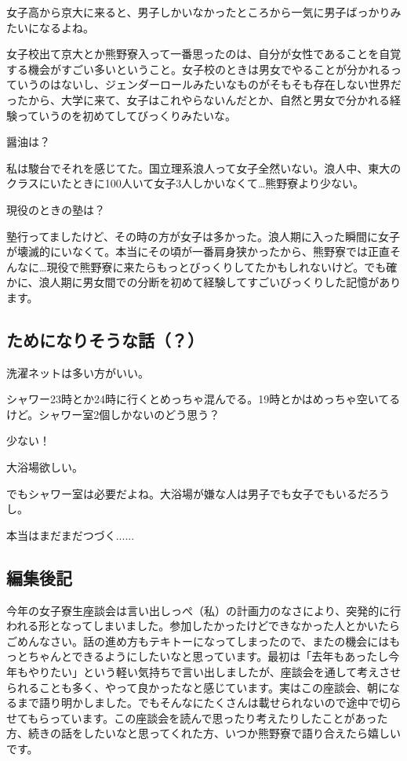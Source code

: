 \begin{multicols}{2}
  女子高から京大に来ると、男子しかいなかったところから一気に男子ばっかりみたいになるよね。

  女子校出て京大とか熊野寮入って一番思ったのは、自分が女性であることを自覚する機会がすごい多いということ。女子校のときは男女でやることが分かれるっていうのはないし、ジェンダーロールみたいなものがそもそも存在しない世界だったから、大学に来て、女子はこれやらないんだとか、自然と男女で分かれる経験っていうのを初めてしてびっくりみたいな。

  醤油は？

  私は駿台でそれを感じてた。国立理系浪人って女子全然いない。浪人中、東大のクラスにいたときに100人いて女子3人しかいなくて…熊野寮より少ない。

  現役のときの塾は？

  塾行ってましたけど、その時の方が女子は多かった。浪人期に入った瞬間に女子が壊滅的にいなくて。本当にその頃が一番肩身狭かったから、熊野寮では正直そんなに…現役で熊野寮に来たらもっとびっくりしてたかもしれないけど。でも確かに、浪人期に男女間での分断を初めて経験してすごいびっくりした記憶があります。

  \subsection{ためになりそうな話（？）}

  洗濯ネットは多い方がいい。

  シャワー23時とか24時に行くとめっちゃ混んでる。19時とかはめっちゃ空いてるけど。シャワー室2個しかないのどう思う？

  少ない！

  大浴場欲しい。

  でもシャワー室は必要だよね。大浴場が嫌な人は男子でも女子でもいるだろうし。



  本当はまだまだつづく......

\end{multicols}


\subsection{編集後記}



今年の女子寮生座談会は言い出しっぺ（私）の計画力のなさにより、突発的に行われる形となってしまいました。参加したかったけどできなかった人とかいたらごめんなさい。話の進め方もテキトーになってしまったので、またの機会にはもっとちゃんとできるようにしたいなと思っています。最初は「去年もあったし今年もやりたい」という軽い気持ちで言い出しましたが、座談会を通して考えさせられることも多く、やって良かったなと感じています。実はこの座談会、朝になるまで語り明かしました。でもそんなにたくさんは載せられないので途中で切らせてもらっています。この座談会を読んで思ったり考えたりしたことがあった方、続きの話をしたいなと思ってくれた方、いつか熊野寮で語り合えたら嬉しいです。

